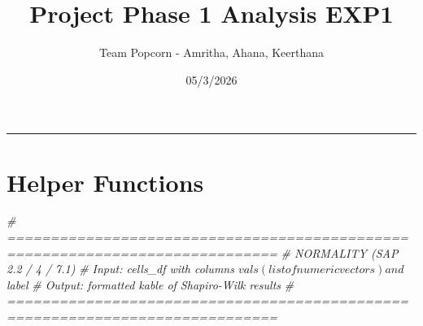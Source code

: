 \documentclass[
]{article}
\title{Project Phase 1 Analysis EXP1}
\author{Team Popcorn - Amritha, Ahana, Keerthana}
\date{05/3/2026}
\newenvironment{Shaded}{\begin{snugshade}}{\end{snugshade}}
\newcommand{\CommentTok}[1]{\textcolor[rgb]{0.56,0.35,0.01}{\textit{#1}}}
\begin{document}
\maketitle

{
\setcounter{tocdepth}{3}
\tableofcontents
}
\begin{center}\rule{0.5\linewidth}{0.5pt}\end{center}

\section{Helper Functions}\label{helper-functions}

\begin{Shaded}
\begin{Highlighting}[]
\CommentTok{\# =============================================================================}
\CommentTok{\# NORMALITY  (SAP 2.2 / 4 / 7.1)}
\CommentTok{\# Input:  cells\_df with columns $vals (list of numeric vectors) and $label}
\CommentTok{\# Output: formatted kable of Shapiro{-}Wilk results}
\CommentTok{\# =============================================================================}


\end{Highlighting}
\end{Shaded}
\end{document}
